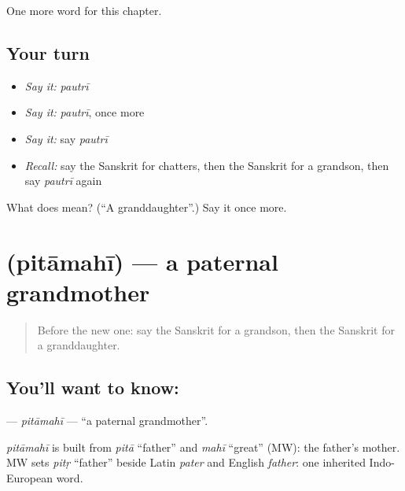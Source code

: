 \begin{grammarlens}[title={What you've built}]
One more word for this chapter.
\end{grammarlens}

\subsection*{Your turn}
\begin{itemize}
\raggedright
  \item \emph{Say it:} \emph{pautrī}
  \item \emph{Say it:} \emph{pautrī}, once more
  \item \emph{Say it:} say \emph{pautrī}
  \item \emph{Recall:} say the Sanskrit for chatters, then the Sanskrit for a grandson, then say \emph{pautrī} again
\end{itemize}

\begin{tcolorbox}[breakable,colback=teal!4,colframe=teal!35!black,title={Before you move on}]
What does  mean? (\textquotedblleft{}A granddaughter\textquotedblright{}.) Say it once more.
\end{tcolorbox}
\section[\texorpdfstring{\sk{पितामही} (pitāmahī)}{पितामही (pitāmahī)}]{ (pitāmahī) — a paternal grandmother}

\label{lesson:SA-C146-pitamahi}



\begin{quote}
Before the new one: say the Sanskrit for a grandson, then the Sanskrit for a granddaughter.
\end{quote}

\subsection*{You'll want to know: }
\textbf{} — \emph{pitāmahī} — \textquotedblleft{}a paternal grandmother\textquotedblright{}.

\begin{cousinweb}
\emph{pitāmahī} is built from \emph{pitā} \textquotedblleft{}father\textquotedblright{} and \emph{mahī} \textquotedblleft{}great\textquotedblright{} (MW): the father's mother. MW sets \emph{pitṛ} \textquotedblleft{}father\textquotedblright{} beside Latin \emph{pater} and English \emph{father}: one inherited Indo-European word.
\end{cousinweb}

